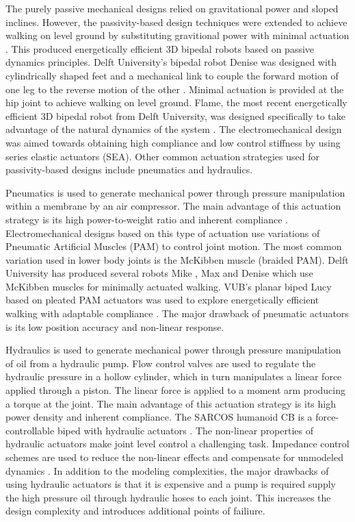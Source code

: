The purely passive mechanical designs relied on gravitational power and sloped inclines. However, the passivity-based design techniques were extended to achieve walking on level ground by substituting gravitional power with minimal actuation \cite{Collins:2005vp}. This produced energetically efficient 3D bipedal robots based on passive dynamics principles. Delft University's bipedal robot Denise was designed with cylindrically shaped feet and a mechanical link to couple the forward motion of one leg to the reverse motion of the other \cite{Anderson:2005cw}. Minimal actuation is provided at the hip joint to achieve walking on level ground. Flame, the most recent energetically efficient 3D bipedal robot from Delft University, was designed specifically to take advantage of the natural dynamics of the system \cite{Hobbelen2008}. The electromechanical design was aimed towards obtaining high compliance and low control stiffness by using series elastic actuators (SEA). Other common actuation strategies used for passivity-based designs include pneumatics and hydraulics. 


Pneumatics is used to generate mechanical power through pressure manipulation within a membrane by an air compressor. The main advantage of this actuation strategy is its high power-to-weight ratio and inherent compliance \cite{Wisse2007}. Electromechanical designs based on this type of actuation use variations of Pneumatic Artificial Muscles (PAM) to control joint motion. The most common variation used in lower body joints is the McKibben muscle (braided PAM). Delft University has produced several robots Mike \cite{Wisse2003}, Max \cite{Hobbelen2005} and Denise \cite{Hobbelen2008,Wisse:2007wh} which use McKibben muscles for minimally actuated walking. VUB's planar biped Lucy based on pleated PAM actuators was used to explore energetically efficient walking with adaptable compliance \cite{Vanderborght:2005kq}. The major drawback of pneumatic actuators is its low position accuracy and non-linear response. 

Hydraulics is used to generate mechanical power through pressure manipulation of oil from a hydraulic pump. Flow control valves are used to regulate the hydraulic pressure in a hollow cylinder, which in turn manipulates a linear force applied through a piston. The linear force is applied to a moment arm producing a torque at the joint. The main advantage of this actuation strategy is its high power density and inherent compliance. The SARCOS humanoid CB is a force-controllable biped with hydraulic actuators \cite{SangHoHyon:2007jy}. The non-linear properties of hydraulic actuators make joint level control a challenging task. Impedance control schemes are used to reduce the non-linear effects and compensate for unmodeled dynamics \cite{Bilodeau1998}. In addition to the modeling complexities, the major drawbacks of using hydraulic actuators is that it is expensive and a pump is required supply the high pressure oil through hydraulic hoses to each joint. This increases the design complexity and introduces additional points of failiure.

